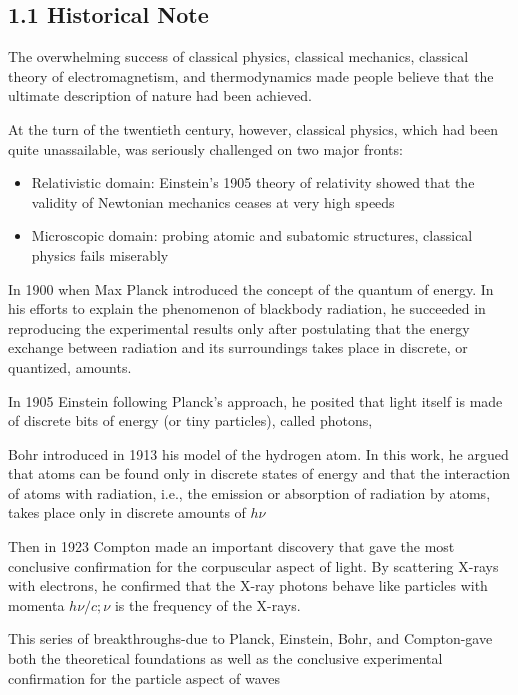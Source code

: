\documentclass[10pt]{article}
\begin{document}
\subsection*{1.1 Historical Note}
    The overwhelming success of classical physics, classical mechanics, classical theory of electromagnetism, and thermodynamics made people believe that the ultimate description of nature had been achieved.
    
    At the turn of the twentieth century, however, classical physics, which had been quite unassailable, was seriously challenged on two major fronts:
    
    \begin{itemize}
      \item Relativistic domain: Einstein's 1905 theory of relativity showed that the validity of Newtonian mechanics ceases at very high speeds 
      \item Microscopic domain: probing atomic and subatomic structures, classical physics fails miserably 
    \end{itemize}
    
    In 1900 when Max Planck introduced the concept of the quantum of energy. In his efforts to explain the phenomenon of blackbody radiation, he succeeded in reproducing the experimental results only after postulating that the energy exchange between radiation and its surroundings takes place in discrete, or quantized, amounts. 

    In 1905 Einstein following Planck's approach, he posited that light itself is made of discrete bits of energy (or tiny particles), called photons, 
    
    Bohr introduced in 1913 his model of the hydrogen atom. In this work, he argued that atoms can be found only in discrete states of energy and that the interaction of atoms with radiation, i.e., the emission or absorption of radiation by atoms, takes place only in discrete amounts of $h \nu$ 
    
    Then in 1923 Compton made an important discovery that gave the most conclusive confirmation for the corpuscular aspect of light. By scattering X-rays with electrons, he confirmed that the X-ray photons behave like particles with momenta $h \nu / c ; \nu$ is the frequency of the X-rays.
    
    This series of breakthroughs-due to Planck, Einstein, Bohr, and Compton-gave both the theoretical foundations as well as the conclusive experimental confirmation for the particle aspect of waves
    
\end{document}
